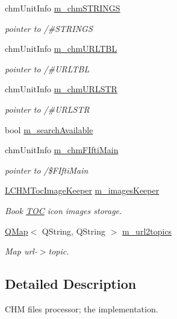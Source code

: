 \begin{DoxyCompactItemize}
chm\+Unit\+Info \hyperlink{classLCHMFileImpl_a73ed5eac37c22b2cd6d7fbc2a78b60db}{m\+\_\+chm\+S\+T\+R\+I\+N\+G\+S}
\begin{DoxyCompactList}\small\item\em pointer to /\#\+S\+T\+R\+I\+N\+G\+S \end{DoxyCompactList}\item 
chm\+Unit\+Info \hyperlink{classLCHMFileImpl_a6570c3bf72f4ed7ee5992005a88320c9}{m\+\_\+chm\+U\+R\+L\+T\+B\+L}
\begin{DoxyCompactList}\small\item\em pointer to /\#\+U\+R\+L\+T\+B\+L \end{DoxyCompactList}\item 
chm\+Unit\+Info \hyperlink{classLCHMFileImpl_a8b003f45596e247595b90b57b1e8c499}{m\+\_\+chm\+U\+R\+L\+S\+T\+R}
\begin{DoxyCompactList}\small\item\em pointer to /\#\+U\+R\+L\+S\+T\+R \end{DoxyCompactList}\item 
bool \hyperlink{classLCHMFileImpl_a7f5f505b00220199785298bdad0627f6}{m\+\_\+search\+Available}
\item 
chm\+Unit\+Info \hyperlink{classLCHMFileImpl_aff4c9c66f19b11205e4cbdabc7b2d8aa}{m\+\_\+chm\+F\+Ifti\+Main}
\begin{DoxyCompactList}\small\item\em pointer to /\$\+F\+Ifti\+Main \end{DoxyCompactList}\item 
\hyperlink{classLCHMTocImageKeeper}{L\+C\+H\+M\+Toc\+Image\+Keeper} \hyperlink{classLCHMFileImpl_afbd4fcdb78858fab9c7c594c58cd4367}{m\+\_\+images\+Keeper}
\begin{DoxyCompactList}\small\item\em Book \hyperlink{classTOC}{T\+O\+C} icon images storage. \end{DoxyCompactList}\item 
\hyperlink{classQMap}{Q\+Map}$<$ Q\+String, Q\+String $>$ \hyperlink{classLCHMFileImpl_ace36f0ffc8316cb551fb236989552620}{m\+\_\+url2topics}
\begin{DoxyCompactList}\small\item\em Map url-\/$>$topic. \end{DoxyCompactList}\end{DoxyCompactItemize}


\subsection{Detailed Description}
C\+H\+M files processor; the implementation. 

